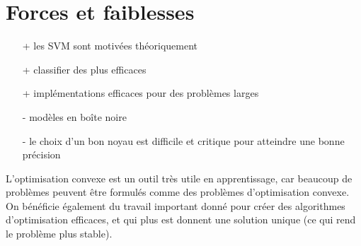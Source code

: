 \section{Forces et faiblesses}

\begin{itemize}
	\item[+] les SVM sont motivées théoriquement
	\item[+] classifier des plus efficaces
	\item[+] implémentations efficaces pour des problèmes larges
	\item[-] modèles en boîte noire
	\item[-] le choix d'un bon noyau est difficile et critique pour atteindre une bonne précision
\end{itemize}

L'optimisation convexe est un outil très utile en apprentissage, car beaucoup de problèmes peuvent être formulés comme des problèmes d'optimisation convexe. On bénéficie également du travail important donné pour créer des algorithmes d'optimisation efficaces, et qui plus est donnent une solution unique (ce qui rend le problème plus stable).